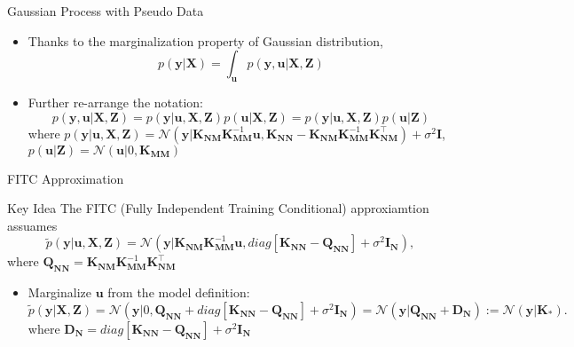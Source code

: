 \documentclass{beamer}
\begin{document}
\begin{frame}{Gaussian Process with Pseudo Data}
\begin{itemize}
      \item Thanks to the marginalization property of Gaussian distribution,
      \[p(\mathbf{y}|\mathbf{X})=\int_{\mathbf{u}}p(\mathbf{y},\mathbf{u}|\mathbf{X},\mathbf{Z})\]
      \item Further re-arrange the notation:
      \[p(\mathbf{y},\mathbf{u}|\mathbf{X},\mathbf{Z})=p(\mathbf{y}|\mathbf{u},\mathbf{X},\mathbf{Z})p(\mathbf{u}|\mathbf{X},\mathbf{Z})=p(\mathbf{y}|\mathbf{u},\mathbf{X},\mathbf{Z})p(\mathbf{u}|\mathbf{Z})\]
      where 
      $p (\mathbf{y}|\mathbf{u},\mathbf{X},\mathbf{Z}) = \mathcal{N}(\mathbf{y}|\mathbf{K}_{\mathbf{NM}}\mathbf{K}^{-1}_{\mathbf{MM}}\mathbf{u},\mathbf{K}_{\mathbf{NN}}-\mathbf{K}_{\mathbf{NM}}\mathbf{K}_{\mathbf{MM}}^{-1}\mathbf{K}_{\mathbf{NM}}^{\top}) + \sigma^2\mathbf{I}$,
      $p(\mathbf{u}|\mathbf{Z})                        = \mathcal{N}(\mathbf{u}|0,\mathbf{K}_{\mathbf{MM}})$
\end{itemize}
\end{frame}
\begin{frame}{FITC Approximation}
      \begin{block}{Key Idea}
            The FITC (Fully Independent Training Conditional) approxiamtion assuames 
      \[\tilde{p} (\mathbf{y}|\mathbf{u},\mathbf{X},\mathbf{Z}) = \mathcal{N}(\mathbf{y}|\mathbf{K}_{\mathbf{NM}}\mathbf{K}^{-1}_{\mathbf{MM}}\mathbf{u},diag[\mathbf{K}_{\mathbf{NN}}-\mathbf{Q}_{\mathbf{NN}}] + \sigma^2\mathbf{I}_{\mathbf{N}}),\]
      where $\mathbf{Q}_{\mathbf{NN}} = \mathbf{K}_{\mathbf{NM}}\mathbf{K}_{\mathbf{MM}}^{-1}\mathbf{K}_{\mathbf{NM}}^{\top}$
      \end{block}
      \begin{itemize}
            \item Marginalize $\mathbf{u}$ from the model definition:
      \[\tilde{p} (\mathbf{y}|\mathbf{X},\mathbf{Z}) = \mathcal{N}(\mathbf{y}|0,\mathbf{Q}_{\mathbf{NN}}+diag[\mathbf{K}_{\mathbf{NN}}-\mathbf{Q}_{\mathbf{NN}}] + \sigma^2\mathbf{I}_{\mathbf{N}})=\mathcal{N}(\mathbf{y}|\mathbf{Q}_{\mathbf{NN}}+\mathbf{D}_{\mathbf{N}}):=\mathcal{N}(\mathbf{y}|\mathbf{K}_*).\]
            where $\mathbf{D}_{\mathbf{N}} = diag[\mathbf{K}_{\mathbf{NN}}-\mathbf{Q}_{\mathbf{NN}}] + \sigma^2\mathbf{I}_{\mathbf{N}}$
      \end{itemize}
\end{frame}
\end{document}
